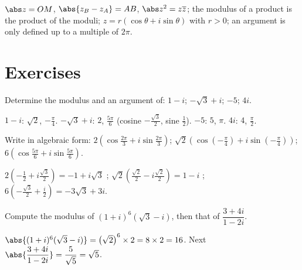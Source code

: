 \begin{keypoint}
$\abs z=OM$, $\abs{z_B-z_A}=AB$, $\abs z^2=z\overline z$; the modulus of a product is the product of the moduli; $z=r(\cos\theta+i\sin\theta)$ with $r>0$; an argument is only defined up to a multiple of $2\pi$.
\end{keypoint}

\mxnewpage
\section{Exercises}
\begin{exercise}
Determine the modulus and an argument of: $1-i$; $-\sqrt3+i$; $-5$; $4i$.
\end{exercise}
\begin{solution}
$1-i$: $\sqrt2$, $-\frac\pi4$. $-\sqrt3+i$: $2$, $\frac{5\pi}6$ (cosine $-\frac{\sqrt3}2$, sine $\frac12$). $-5$: $5$, $\pi$. $4i$: $4$, $\frac\pi2$.
\end{solution}

\begin{exercise}
Write in algebraic form: $2\left(\cos\frac{2\pi}3+i\sin\frac{2\pi}3\right)$; $\sqrt2\left(\cos\left(-\frac\pi4\right)+i\sin\left(-\frac\pi4\right)\right)$; $6\left(\cos\frac{5\pi}6+i\sin\frac{5\pi}6\right)$.
\end{exercise}
\begin{solution}
$2\left(-\frac12+i\frac{\sqrt3}2\right)=-1+i\sqrt3$ ; $\sqrt2\left(\frac{\sqrt2}2-i\frac{\sqrt2}2\right)=1-i$ ; $6\left(-\frac{\sqrt3}2+\frac i2\right)=-3\sqrt3+3i$.
\end{solution}

\begin{exercise}
Compute the modulus of $(1+i)^6\left(\sqrt3-i\right)$, then that of $\dfrac{3+4i}{1-2i}$.
\end{exercise}
\begin{solution}
$\abs{(1+i)^6(\sqrt3-i)}=\left(\sqrt2\right)^6\times2=8\times2=16$. Next $\abs{\dfrac{3+4i}{1-2i}}=\dfrac{5}{\sqrt5}=\sqrt5$.
\end{solution}

